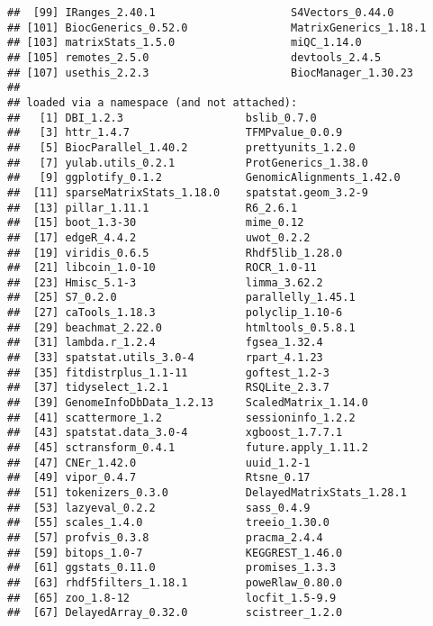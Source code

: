 \documentclass[
  11pt,
  a4paper,
]{article}
\begin{document}
\begin{verbatim}
##  [99] IRanges_2.40.1                     S4Vectors_0.44.0                  
## [101] BiocGenerics_0.52.0                MatrixGenerics_1.18.1             
## [103] matrixStats_1.5.0                  miQC_1.14.0                       
## [105] remotes_2.5.0                      devtools_2.4.5                    
## [107] usethis_2.2.3                      BiocManager_1.30.23               
## 
## loaded via a namespace (and not attached):
##   [1] DBI_1.2.3                   bslib_0.7.0                
##   [3] httr_1.4.7                  TFMPvalue_0.0.9            
##   [5] BiocParallel_1.40.2         prettyunits_1.2.0          
##   [7] yulab.utils_0.2.1           ProtGenerics_1.38.0        
##   [9] ggplotify_0.1.2             GenomicAlignments_1.42.0   
##  [11] sparseMatrixStats_1.18.0    spatstat.geom_3.2-9        
##  [13] pillar_1.11.1               R6_2.6.1                   
##  [15] boot_1.3-30                 mime_0.12                  
##  [17] edgeR_4.4.2                 uwot_0.2.2                 
##  [19] viridis_0.6.5               Rhdf5lib_1.28.0            
##  [21] libcoin_1.0-10              ROCR_1.0-11                
##  [23] Hmisc_5.1-3                 limma_3.62.2               
##  [25] S7_0.2.0                    parallelly_1.45.1          
##  [27] caTools_1.18.3              polyclip_1.10-6            
##  [29] beachmat_2.22.0             htmltools_0.5.8.1          
##  [31] lambda.r_1.2.4              fgsea_1.32.4               
##  [33] spatstat.utils_3.0-4        rpart_4.1.23               
##  [35] fitdistrplus_1.1-11         goftest_1.2-3              
##  [37] tidyselect_1.2.1            RSQLite_2.3.7              
##  [39] GenomeInfoDbData_1.2.13     ScaledMatrix_1.14.0        
##  [41] scattermore_1.2             sessioninfo_1.2.2          
##  [43] spatstat.data_3.0-4         xgboost_1.7.7.1            
##  [45] sctransform_0.4.1           future.apply_1.11.2        
##  [47] CNEr_1.42.0                 uuid_1.2-1                 
##  [49] vipor_0.4.7                 Rtsne_0.17                 
##  [51] tokenizers_0.3.0            DelayedMatrixStats_1.28.1  
##  [53] lazyeval_0.2.2              sass_0.4.9                 
##  [55] scales_1.4.0                treeio_1.30.0              
##  [57] profvis_0.3.8               pracma_2.4.4               
##  [59] bitops_1.0-7                KEGGREST_1.46.0            
##  [61] ggstats_0.11.0              promises_1.3.3             
##  [63] rhdf5filters_1.18.1         poweRlaw_0.80.0            
##  [65] zoo_1.8-12                  locfit_1.5-9.9             
##  [67] DelayedArray_0.32.0         scistreer_1.2.0            

\end{verbatim}
\end{document}
